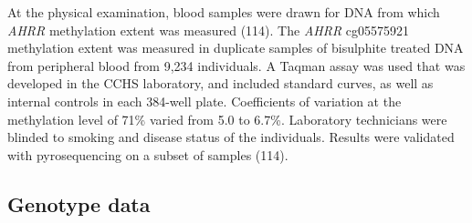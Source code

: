 \documentclass[11pt,twoside]{bristolthesis}
\begin{document}
At the physical examination, blood samples were drawn for DNA from which \emph{AHRR} methylation extent was measured (114). The \emph{AHRR} cg05575921 methylation extent was measured in duplicate samples of bisulphite treated DNA from peripheral blood from 9,234 individuals. A Taqman assay was used that was developed in the CCHS laboratory, and included standard curves, as well as internal controls in each 384-well plate. Coefficients of variation at the methylation level of 71\% varied from 5.0 to 6.7\%. Laboratory technicians were blinded to smoking and disease status of the individuals. Results were validated with pyrosequencing on a subset of samples (114).

\hypertarget{cchs-genotype-data}{%
\subsection{Genotype data}\label{cchs-genotype-data}}
\end{document}
